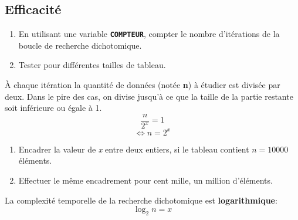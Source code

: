 \documentclass[a4paper,11pt]{article}
\begin{document}
\subsection{Efficacité}
\begin{activite}
\begin{enumerate}
    \item En utilisant une variable \textbf{\texttt{COMPTEUR}}, compter le nombre d'itérations de la boucle de recherche dichotomique.
    \item Tester pour différentes tailles de tableau.
\end{enumerate}
\end{activite}
À chaque itération la quantité de données (notée \textbf{n}) à étudier est divisée par deux. Dans le pire des cas, on divise jusqu'à ce que la taille de la partie restante soit inférieure ou égale à 1.
$$\dfrac{n}{2^x}=1$$
$$\Leftrightarrow n=2^x$$
\begin{activite}
\begin{enumerate}
    \item Encadrer la valeur de \emph{x} entre deux entiers, si le tableau contient $n=10000$ éléments.
    \item Effectuer le même encadrement pour cent mille, un million d'éléments.
\end{enumerate}
\end{activite}
\begin{aretenir}[]
La complexité temporelle de la recherche dichotomique est \textbf{logarithmique}:
{\Large$$ \log_2{n} =x$$}
\end{aretenir}
\end{document}
